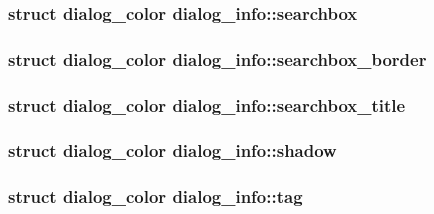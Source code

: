 \hypertarget{structdialog__info_a494700ebb921a252456b47c6f6bc3e46}{
\subsubsection[{searchbox}]{\setlength{\rightskip}{0pt plus 5cm}struct {\bf dialog\-\_\-color} dialog\-\_\-info\-::searchbox}}\label{structdialog__info_a494700ebb921a252456b47c6f6bc3e46}
\hypertarget{structdialog__info_af26d5256e0a31a0611b6a859618d9f37}{
\subsubsection[{searchbox\-\_\-border}]{\setlength{\rightskip}{0pt plus 5cm}struct {\bf dialog\-\_\-color} dialog\-\_\-info\-::searchbox\-\_\-border}}\label{structdialog__info_af26d5256e0a31a0611b6a859618d9f37}
\hypertarget{structdialog__info_af22e65ea0d4c967555529436af2281a1}{
\subsubsection[{searchbox\-\_\-title}]{\setlength{\rightskip}{0pt plus 5cm}struct {\bf dialog\-\_\-color} dialog\-\_\-info\-::searchbox\-\_\-title}}\label{structdialog__info_af22e65ea0d4c967555529436af2281a1}
\hypertarget{structdialog__info_a99ef49fd11e20b8abcd7afd043d56f45}{
\subsubsection[{shadow}]{\setlength{\rightskip}{0pt plus 5cm}struct {\bf dialog\-\_\-color} dialog\-\_\-info\-::shadow}}\label{structdialog__info_a99ef49fd11e20b8abcd7afd043d56f45}
\hypertarget{structdialog__info_a18588fc18a98f029a6ebb70f961c00cb}{
\subsubsection[{tag}]{\setlength{\rightskip}{0pt plus 5cm}struct {\bf dialog\-\_\-color} dialog\-\_\-info\-::tag}}\label{structdialog__info_a18588fc18a98f029a6ebb70f961c00cb}

